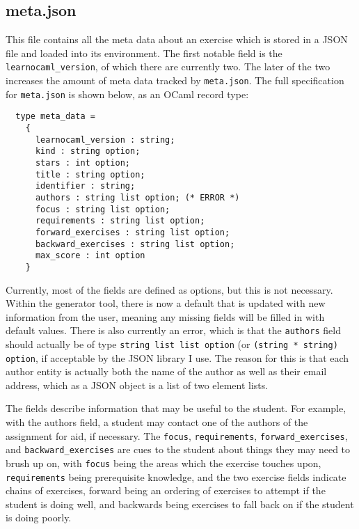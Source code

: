 \documentclass[11pt]{article} %
\begin{document}
\subsection{meta.json}

This file contains all the meta data about an exercise which is stored in a JSON file and loaded into its environment. The first notable field is the \verb+learnocaml_version+, of which there are currently two. The later of the two increases the amount of meta data tracked by \verb+meta.json+. The full specification for \verb+meta.json+ is shown below, as an OCaml record type:

\begin{lstlisting}
  type meta_data =
    {
      learnocaml_version : string;
      kind : string option;
      stars : int option;
      title : string option;
      identifier : string;
      authors : string list option; (* ERROR *)
      focus : string list option;
      requirements : string list option;
      forward_exercises : string list option;
      backward_exercises : string list option;
      max_score : int option
    }

\end{lstlisting}

Currently, most of the fields are defined as options, but this is not necessary. Within the generator tool, there is now a default that is updated with new information from the user, meaning any missing fields will be filled in with default values. There is also currently an error, which is that the \verb+authors+ field should actually be of type \verb+string list list option+ (or \verb+(string * string) option+, if acceptable by the JSON library I use. The reason for this is that each author entity is actually both the name of the author as well as their email address, which as a JSON object is a list of two element lists.

The fields describe information that may be useful to the student. For example, with the authors field, a student may contact one of the authors of the assignment for aid, if necessary. The \verb+focus+, \verb+requirements+, \verb+forward_exercises+, and \verb+backward_exercises+ are cues to the student about things they may need to brush up on, with \verb+focus+ being the areas which the exercise touches upon, \verb+requirements+ being prerequisite knowledge, and the two exercise fields indicate chains of exercises, forward being an ordering of exercises to attempt if the student is doing well, and backwards being exercises to fall back on if the student is doing poorly.
\end{document}
